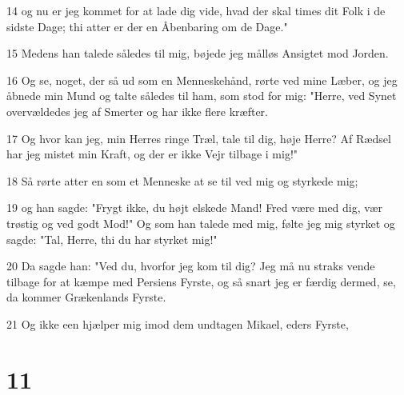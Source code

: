 \par 14 og nu er jeg kommet for at lade dig vide, hvad der skal times dit Folk i de sidste Dage; thi atter er der en Åbenbaring om de Dage."
\par 15 Medens han talede således til mig, bøjede jeg målløs Ansigtet mod Jorden.
\par 16 Og se, noget, der så ud som en Menneskehånd, rørte ved mine Læber, og jeg åbnede min Mund og talte således til ham, som stod for mig: "Herre, ved Synet overvældedes jeg af Smerter og har ikke flere kræfter.
\par 17 Og hvor kan jeg, min Herres ringe Træl, tale til dig, høje Herre? Af Rædsel har jeg mistet min Kraft, og der er ikke Vejr tilbage i mig!"
\par 18 Så rørte atter en som et Menneske at se til ved mig og styrkede mig;
\par 19 og han sagde: "Frygt ikke, du højt elskede Mand! Fred være med dig, vær trøstig og ved godt Mod!" Og som han talede med mig, følte jeg mig styrket og sagde: "Tal, Herre, thi du har styrket mig!"
\par 20 Da sagde han: "Ved du, hvorfor jeg kom til dig? Jeg må nu straks vende tilbage for at kæmpe med Persiens Fyrste, og så snart jeg er færdig dermed, se, da kommer Grækenlands Fyrste.
\par 21 Og ikke een hjælper mig imod dem undtagen Mikael, eders Fyrste,

\chapter{11}

